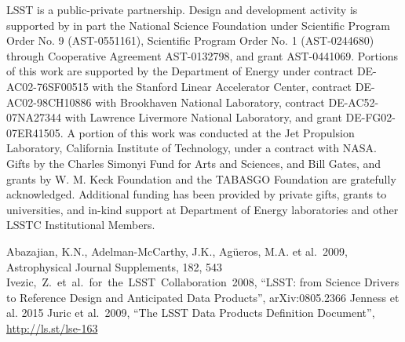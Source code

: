 \documentclass[11pt,twoside]{article}
\begin{document}
\acknowledgements 

LSST is a public-private partnership.  Design and development activity is
supported by in part the National Science Foundation under Scientific
Program Order No. 9 (AST-0551161), Scientific Program Order No. 1
(AST-0244680) through Cooperative Agreement AST-0132798, and grant AST-0441069. 
Portions of this work are supported by the Department of Energy under contract
DE-AC02-76SF00515 with the Stanford Linear Accelerator Center, contract
DE-AC02-98CH10886 with Brookhaven National Laboratory, contract
DE-AC52-07NA27344 with Lawrence Livermore National Laboratory, and grant
DE-FG02-07ER41505. A portion of this work was conducted at the Jet Propulsion 
Laboratory, California Institute of Technology, under a contract with NASA.
Gifts by the Charles Simonyi Fund for Arts and Sciences,
and Bill Gates, and grants by W. M. Keck Foundation and the TABASGO Foundation
are gratefully acknowledged. Additional funding has been provided by private gifts, grants 
to universities, and in-kind support at Department of Energy laboratories and other 
LSSTC Institutional Members.  


\begin{thebibliography}{}

 Abazajian, K.N., Adelman-McCarthy, J.K., Ag\"ueros,  M.A. et al.~2009, Astrophysical Journal Supplements, 182, 543
 Ivezic,~Z.~et~al.~for~the~LSST~Collaboration~2008, ``LSST: from Science Drivers to Reference Design and Anticipated Data Products'', arXiv:0805.2366
 Jenness et al. 2015
 Juric et al.~2009, ``The LSST Data Products Definition Document'', {\footnotesize \url{http://ls.st/lse-163}}

\end{thebibliography}
\end{document}
